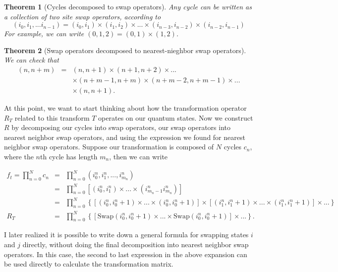 \documentclass{article}
\newtheorem{theorem}{Theorem}[section]
\theoremstyle{definition}
\begin{document}
\begin{theorem}[Cycles decomposed to swap operators]
Any cycle can be written as a collection of two site swap operators, according to
\begin{equation}
(i_0,i_1,...i_{n-1}) = (i_0,i_1) \times (i_1,i_2) \times ... \times (i_{n-3}, i_{n-2}) \times (i_{n-2}, i_{n-1})
\end{equation} 
For example, we can write $(0,1,2) = (0,1) \times (1,2)$.
\end{theorem}

\begin{theorem}[Swap operators decomposed to nearest-nieghbor swap operators]
We can check that
\begin{eqnarray}
(n,n+m) &=& (n,n+1) \times (n+1,n+2) \times ... \\
&&\times (n+m-1,n+m) \times (n+m-2,n+m-1) \times ...\\
&& \times (n,n+1).
\end{eqnarray}
\end{theorem}

At this point, we want to start thinking about how the transformation operator $R_T$ related to this transform $T$ operates on our quantum states. 
Now we construct $R$ by decomposing our cycles into swap operators, our swap operators into nearest neighbor swap operators, and using the expression we found for nearest neighbor swap operators. Suppose our transformation is composed of $N$ cycles $c_n$, where the $n$th cycle has length $m_n$, then we can write

\begin{eqnarray}
f_t = \prod_{n=0}^N c_n &=&\prod_{n=0}^N (i^n_0,i^n_1,...,i^n_{m_n}) \\
&=& \prod_{n=0}^N \left[(i^n_0,i^n_1) \times ... \times (i^n_{m_n-1} i^n_{m_n})\right]\\
&=& \prod_{n=0}^N \left \{\left[(i^n_0,i^n_0+1)\times ... \times (i^n_0,i^n_0+1)\right] \times \left[ (i^n_1,i^n_1+1)\times ... \times (i^n_1,i^n_1+1)\right] \times ... \right\} \\
R_T &=& \prod_{n=0}^N \left\{\left[\text{Swap}(i^n_0,i^n_0+1) \times ... \times \text{Swap}(i^n_0,i^n_0+1)\right] \times ... \right\}.
\end{eqnarray}

I later realized it is possible to write down a general formula for swapping states $i$ and $j$ directly, without doing the final decomposition into nearest neighbor swap operators. In this case, the second to last expression in the above expansion can be used directly to calculate the transformation matrix.
\end{document}
